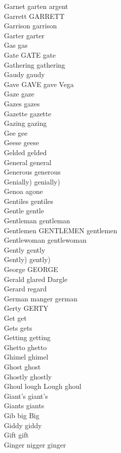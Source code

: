 Garnet garten argent\\
Garrett GARRETT\\
Garrison garrison\\
Garter garter\\
Gas gas\\
Gate GATE gate\\
Gathering gathering\\
Gaudy gaudy\\
Gave GAVE gave Vega\\
Gaze gaze\\
Gazes gazes\\
Gazette gazette\\
Gazing gazing\\
Gee gee\\
Geese geese\\
Gelded gelded\\
General general\\
Generous generous\\
Genially) genially)\\
Genoa agone\\
Gentiles gentiles\\
Gentle gentle\\
Gentleman gentleman\\
Gentlemen GENTLEMEN gentlemen\\
Gentlewoman gentlewoman\\
Gently gently\\
Gently) gently)\\
George GEORGE\\
Gerald glared Dargle\\
Gerard regard\\
German manger german\\
Gerty GERTY\\
Get get\\
Gets gets\\
Getting getting\\
Ghetto ghetto\\
Ghimel ghimel\\
Ghost ghost\\
Ghostly ghostly\\
Ghoul lough Lough ghoul\\
Giant's giant's\\
Giants giants\\
Gib big Big\\
Giddy giddy\\
Gift gift\\
Ginger nigger ginger\\
